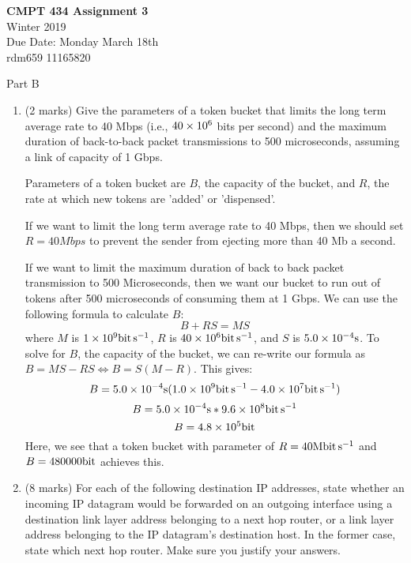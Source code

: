 \documentclass[10pt]{amsart}
\begin{document}
 \textbf{CMPT 434 Assignment 3} \\ Winter 2019\\
Due Date: Monday March 18th\\
rdm659 11165820

Part B

\begin{enumerate}
    \item (2 marks) Give the parameters of a token bucket that limits the long
        term average rate to 40 Mbps (i.e., $\num{40E6}$ bits per second) and the
        maximum duration of back-to-back packet transmissions to 500
        microseconds, assuming a link of capacity of 1 Gbps.

        Parameters of a token bucket are $B$, the capacity of the bucket, and
        $R$, the rate at which new tokens are 'added' or 'dispensed'.

        If we want to limit the long term average rate to 40 Mbps, then we
        should set $R = 40 Mbps$ to prevent the sender from ejecting more than
        40 Mb a second.

        If we want to limit the maximum duration of back to back packet
        transmission to 500 Microseconds, then we want our bucket to run out of
        tokens after 500 microseconds of consuming them at 1 Gbps.  We can use
        the following formula to calculate $B$:
        \[ B + RS = MS \]
        where $M$ is $\num{1E9}\si{\bit\per\second}$, $R$ is
        $\num{40E6}\si{\bit\per\second}$, and $S$ is
        $\num{5.0E-4}\si{\second}$.  To solve for $B$, the capacity of the bucket, we can re-write our
        formula as $B = MS - RS \iff B = S(M-R)$.  This gives:\\
         \[ B = \num{5.0E-4}\si{\second} (\num{1.0E9} \si{\bit\per\second} -
         \num{4.0E7} \si{\bit\per\second}) \]
         \[ B = \num{5.0E-4}\si{\second} * \num{9.6 E8} \si{\bit\per\second} \]
         \[ B = \num{4.8E5}\si{\bit} \]
        Here, we see that a token bucket with parameter of $R = 40
        \si{\mega\bit\per\second}$ and $B = 480000\si{\bit}$ achieves this.

    \item (8 marks) For each of the following destination IP addresses, state whether an
        incoming IP datagram would be forwarded on an outgoing interface using a
        destination link layer address belonging to a next hop router, or a link
        layer address belonging to the IP datagram’s destination host. In the
        former case, state which next hop router. Make sure you justify your
        answers.


\end{enumerate}
\end{document}
